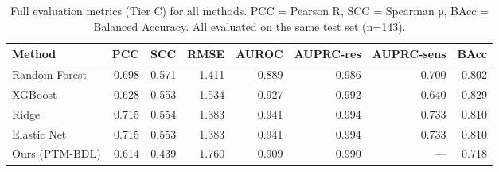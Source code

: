 \begin{table}[htbp]
\centering
\caption{Full evaluation metrics (Tier C) for all methods. PCC = Pearson R, SCC = Spearman ρ, BAcc = Balanced Accuracy. All evaluated on the same test set (n=143).}
\label{tab:s1_full}
\small
\begin{tabular}{lrrrrrrr}
\toprule
\textbf{Method} & \textbf{PCC} & \textbf{SCC} & \textbf{RMSE} & \textbf{AUROC} & \textbf{AUPRC-res} & \textbf{AUPRC-sens} & \textbf{BAcc} \\
\midrule
Random Forest & 0.698 & 0.571 & 1.411 & 0.889 & 0.986 & 0.700 & 0.802 \\
XGBoost & 0.628 & 0.553 & 1.534 & 0.927 & 0.992 & 0.640 & 0.829 \\
Ridge & 0.715 & 0.554 & 1.383 & 0.941 & 0.994 & 0.733 & 0.810 \\
Elastic Net & 0.715 & 0.553 & 1.383 & 0.941 & 0.994 & 0.733 & 0.810 \\
Ours (PTM-BDL) & 0.614 & 0.439 & 1.760 & 0.909 & 0.990 & — & 0.718 \\
\bottomrule
\end{tabular}
\end{table}